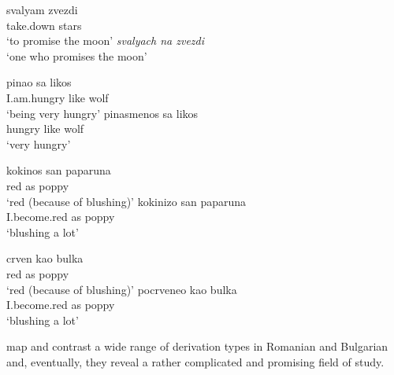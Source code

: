 \documentclass[output=paper]{langsci/langscibook}
\begin{document}
\begin{exe}
\settowidth {}
\ex \label{ex:4:promisemoon}
\begin{xlist}
\ex
\gll 
svalyam zvezdi\\
 take.down stars \\  
\glt`to promise the moon’
\ex
\textit{svalyach na zvezdi}\\ 
`one who promises the moon’
\end{xlist}
\end{exe}

\begin{exe}
\settowidth {}
\ex \label{ex:5:pinaolikos}
\begin{xlist}
\ex
\gll
pinao sa likos\\ 
       I.am.hungry like wolf \\ 
      \glt `being very hungry’
      \ex
\gll pinasmenos sa likos\\
hungry like wolf\\
\glt ‘very hungry’
\end{xlist}
\end{exe}

\begin{exe}
\settowidth {}
\ex \label{ex:6:paparouna}
\begin{xlist}
\ex
\gll 
kokinos san paparuna\\
     red as  poppy \\ 
\glt `red (because of blushing)’
\ex
\gll kokinizo san paparuna\\
      I.become.red as  poppy\\
\glt    `blushing a lot’
\end{xlist}
\end{exe}

\begin{exe}
\settowidth {}
\ex \label{ex:7:bulka}
\begin{xlist}
\ex
\gll 
crven kao bulka\\ 
       red as  poppy \\   
     \glt `red (because of blushing)’
\ex
\gll       pocrveneo kao bulka \\
 I.become.red as poppy\\
 \glt     `blushing a lot’
 \end{xlist}
 \end{exe}
 
 map and contrast a wide range of derivation types in Romanian and Bulgarian and, eventually, they reveal a rather complicated and promising field of study. 
\end{document}
